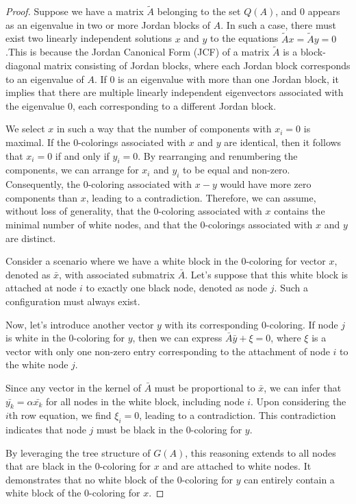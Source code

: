 \begin{proof}
	Suppose we have a matrix $\tilde{A}$ belonging to the set $Q(A)$, and 0 appears as an eigenvalue in two or more Jordan blocks of $A$. In such a case, there must exist two linearly independent solutions $x$ and $y$ to the equations $\tilde{A}x = \tilde{A}y = 0$.This is because the Jordan Canonical Form (JCF) of a matrix $\tilde{A}$ is a block-diagonal matrix consisting of Jordan blocks, where each Jordan block corresponds to an eigenvalue of $A$. If 0 is an eigenvalue with more than one Jordan block, it implies that there are multiple linearly independent eigenvectors associated with the eigenvalue 0, each corresponding to a different Jordan block.
	 
	We select $x$ in such a way that the number of components with $x_i = 0$ is maximal. If the 0-colorings associated with $x$ and $y$ are identical, then it follows that $x_i = 0$ if and only if $y_i = 0$. By rearranging and renumbering the components, we can arrange for $x_i$ and $y_i$ to be equal and non-zero. Consequently, the 0-coloring associated with $x - y$ would have more zero components than $x$, leading to a contradiction. Therefore, we can assume, without loss of generality, that the 0-coloring associated with $x$ contains the minimal number of white nodes, and that the 0-colorings associated with $x$ and $y$ are distinct.
	
	Consider a scenario where we have a white block in the 0-coloring for vector $x$, denoted as $\bar{x}$, with associated submatrix $\bar{A}$. Let's suppose that this white block is attached at node $i$ to exactly one black node, denoted as node $j$. Such a configuration must always exist. 
	
	Now, let's introduce another vector $y$ with its corresponding 0-coloring. If node $j$ is white in the 0-coloring for $y$, then we can express $\bar{A}\bar{y} + \xi = 0$, where $\xi$ is a vector with only one non-zero entry corresponding to the attachment of node $i$ to the white node $j$. 
	
	Since any vector in the kernel of $\bar{A}$ must be proportional to $\bar{x}$, we can infer that $\bar{y_k} = \alpha \bar{x_k}$ for all nodes in the white block, including node $i$. Upon considering the $i$th row equation, we find $\xi_i = 0$, leading to a contradiction. This contradiction indicates that node $j$ must be black in the 0-coloring for $y$.
	
	By leveraging the tree structure of $G(A)$, this reasoning extends to all nodes that are black in the 0-coloring for $x$ and are attached to white nodes. It demonstrates that no white block of the 0-coloring for $y$ can entirely contain a white block of the 0-coloring for $x$. 
	

\end{proof}
